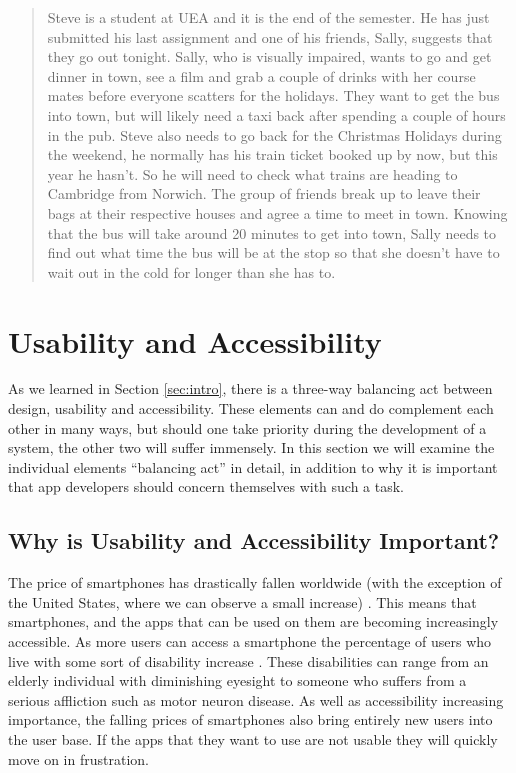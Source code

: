 \documentclass[cmpstyle]{ueacmpstyle}
\begin{document}
		\blockquote{Steve is a student at UEA and it is the end of the semester. He has just submitted his last assignment and one of his friends, Sally, suggests that they go out tonight. Sally, who is visually impaired, wants to go and get dinner in town, see a film and grab a couple of drinks with her course mates before everyone scatters for the holidays. They want to get the bus into town, but will likely need a taxi back after spending a couple of hours in the pub. Steve also needs to go back for the Christmas Holidays during the weekend, he normally has his train ticket booked up by now, but this year he hasn't. So he will need to check what trains are heading to Cambridge from Norwich. The group of friends break up to leave their bags at their respective houses and agree a time to meet in town. Knowing that the bus will take around 20 minutes to get into town, Sally needs to find out what time the bus will be at the stop so that she doesn't have to wait out in the cold for longer than she has to.}
	
	\section{Usability and Accessibility} \label{sec:UnA}
	As we learned in Section \ref{sec:intro}, there is a three-way balancing act between design, usability and accessibility. These elements can and do complement each other in many ways, but should one take priority during the development of a system, the other two will suffer immensely. In this section we will examine the individual elements ``balancing act'' in detail, in addition to why it is important that app developers should concern themselves with such a task.
	
		\subsection{Why is Usability and Accessibility Important?} \label{sec:important} 
		The price of smartphones has drastically fallen worldwide (with the exception of the United States, where we can observe a small increase) \citep{smartphonePrice}. This means that smartphones, and the apps that can be used on them are becoming increasingly accessible. As more users can access a smartphone the percentage of users who live with some sort of disability increase \citep{ofcom}. These disabilities can range from an elderly individual with diminishing eyesight to someone who suffers from a serious affliction such as motor neuron disease. As well as accessibility increasing importance, the falling prices of smartphones also bring entirely new users into the user base. If the apps that they want to use are not usable they will quickly move on in frustration.
		
\end{document}
